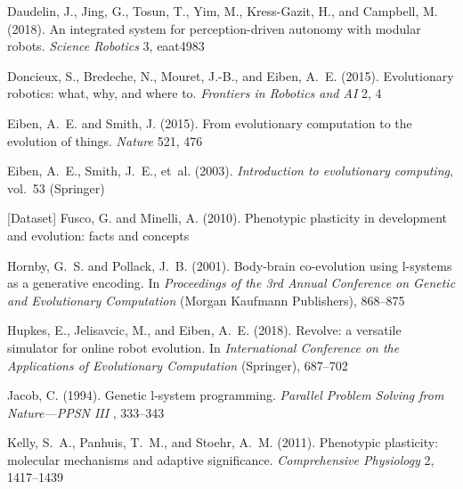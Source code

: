 \documentclass[utf8]{frontiersSCNS} %
\begin{document}
\begin{thebibliography}{29}
Daudelin, J., Jing, G., Tosun, T., Yim, M., Kress-Gazit, H., and Campbell, M.
  (2018).
\newblock An integrated system for perception-driven autonomy with modular
  robots.
\newblock \emph{Science Robotics} 3, eaat4983

Doncieux, S., Bredeche, N., Mouret, J.-B., and Eiben, A.~E. (2015).
\newblock Evolutionary robotics: what, why, and where to.
\newblock \emph{Frontiers in Robotics and AI} 2, 4

Eiben, A.~E. and Smith, J. (2015).
\newblock From evolutionary computation to the evolution of things.
\newblock \emph{Nature} 521, 476

Eiben, A.~E., Smith, J.~E., et~al. (2003).
\newblock \emph{Introduction to evolutionary computing}, vol.~53 (Springer)

[Dataset] Fusco, G. and Minelli, A. (2010).
\newblock Phenotypic plasticity in development and evolution: facts and
  concepts

Hornby, G.~S. and Pollack, J.~B. (2001).
\newblock Body-brain co-evolution using l-systems as a generative encoding.
\newblock In \emph{Proceedings of the 3rd Annual Conference on Genetic and
  Evolutionary Computation} (Morgan Kaufmann Publishers), 868--875

Hupkes, E., Jelisavcic, M., and Eiben, A.~E. (2018).
\newblock Revolve: a versatile simulator for online robot evolution.
\newblock In \emph{International Conference on the Applications of Evolutionary
  Computation} (Springer), 687--702

Jacob, C. (1994).
\newblock Genetic l-system programming.
\newblock \emph{Parallel Problem Solving from Nature—PPSN III} , 333--343

Kelly, S.~A., Panhuis, T.~M., and Stoehr, A.~M. (2011).
\newblock Phenotypic plasticity: molecular mechanisms and adaptive
  significance.
\newblock \emph{Comprehensive Physiology} 2, 1417--1439


\end{thebibliography}
\end{document}
